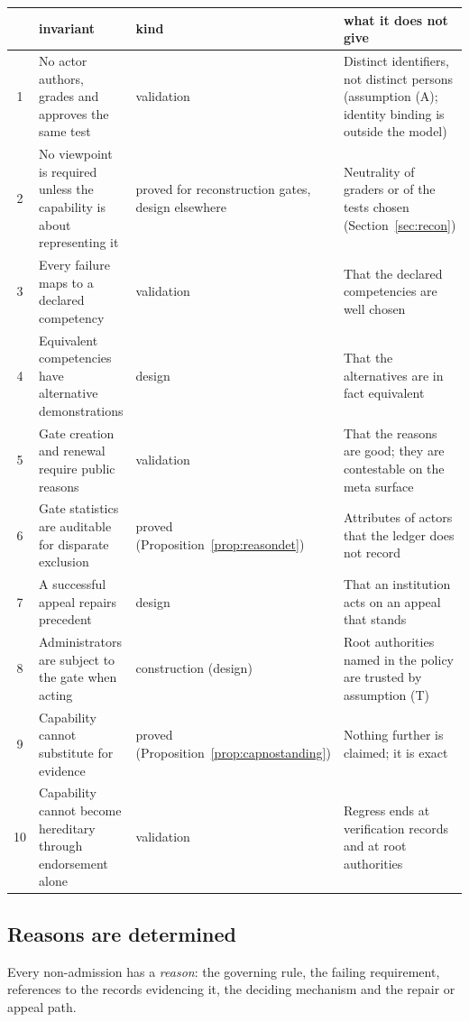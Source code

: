\documentclass[11pt]{article}
\theoremstyle{plain}
\theoremstyle{definition}
\theoremstyle{remark}
\begin{document}
{\small
\begin{longtable}{@{}c >{\raggedright\arraybackslash}p{} >{\raggedright\arraybackslash}p{} >{\raggedright\arraybackslash}p{}@{}}
\toprule
& invariant & kind & what it does not give\\
\midrule
\endhead
1 & No actor authors, grades and approves the same test & validation & Distinct identifiers, not distinct persons (assumption (A); identity binding is outside the model)\\
2 & No viewpoint is required unless the capability is about representing it & proved for reconstruction gates, design elsewhere & Neutrality of graders or of the tests chosen (Section~\ref{sec:recon})\\
3 & Every failure maps to a declared competency & validation & That the declared competencies are well chosen\\
4 & Equivalent competencies have alternative demonstrations & design & That the alternatives are in fact equivalent\\
5 & Gate creation and renewal require public reasons & validation & That the reasons are good; they are contestable on the meta surface\\
6 & Gate statistics are auditable for disparate exclusion & proved (Proposition~\ref{prop:reasondet}) & Attributes of actors that the ledger does not record\\
7 & A successful appeal repairs precedent & design & That an institution acts on an appeal that stands\\
8 & Administrators are subject to the gate when acting & construction (design) & Root authorities named in the policy are trusted by assumption (T)\\
9 & Capability cannot substitute for evidence & proved (Proposition~\ref{prop:capnostanding}) & Nothing further is claimed; it is exact\\
10 & Capability cannot become hereditary through endorsement alone & validation & Regress ends at verification records and at root authorities\\
\bottomrule
\end{longtable}}

\subsection{Reasons are determined}

Every non-admission has a \emph{reason}: the governing rule, the failing requirement, references to the records evidencing it, the deciding mechanism and the repair or appeal path.
\end{document}
